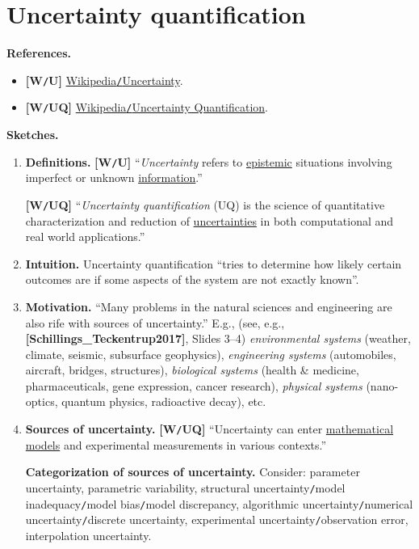 \documentclass[oneside,11pt]{book}
\numberwithin{equation}{section}
\begin{document}
\section{Uncertainty quantification}
\textbf{References.}
\begin{itemize}
    \item \textbf{[W\texttt{/}U]} \href{https://en.wikipedia.org/wiki/Uncertainty}{Wikipedia\texttt{/}Uncertainty}.
    \item \textbf{[W\texttt{/}UQ]} \href{https://en.wikipedia.org/wiki/Uncertainty_quantification}{Wikipedia\texttt{/}Uncertainty Quantification}.
\end{itemize}
\textbf{Sketches.}
\begin{enumerate}
    \item \textbf{Definitions.} \textbf{[W\texttt{/}U]} ``\textit{Uncertainty} refers to \href{https://en.wikipedia.org/wiki/Epistemology}{epistemic} situations involving imperfect or unknown \href{https://en.wikipedia.org/wiki/Information}{information}.''
    
    \textbf{[W\texttt{/}UQ]} ``\textit{Uncertainty quantification} (UQ) is the science of quantitative characterization and reduction of \href{https://en.wikipedia.org/wiki/Uncertainty}{uncertainties} in both computational and real world applications.''
    \item \textbf{Intuition.} Uncertainty quantification ``tries to determine how likely certain outcomes are if some aspects of the system are not exactly known''.
    \item \textbf{Motivation.} ``Many problems in the natural sciences and engineering are also rife with sources of uncertainty.'' E.g., (see, e.g., \textbf{[Schillings\_Teckentrup2017]}, Slides 3--4) \textit{environmental systems} (weather, climate, seismic, subsurface geophysics), \textit{engineering systems} (automobiles, aircraft, bridges, structures), \textit{biological systems} (health \& medicine, pharmaceuticals, gene expression, cancer research), \textit{physical systems} (nano-optics, quantum physics, radioactive decay), etc.
    \item \textbf{Sources of uncertainty.} \textbf{[W\texttt{/}UQ]} ``Uncertainty can enter \href{https://en.wikipedia.org/wiki/Mathematical_model}{mathematical models} and experimental measurements in various contexts.''
    
    \textbf{Categorization of sources of uncertainty.} Consider: parameter uncertainty, parametric variability, structural uncertainty\texttt{/}model inadequacy\texttt{/}model bias\texttt{/}model discrepancy, algorithmic uncertainty\texttt{/}numerical uncertainty\texttt{/}discrete uncertainty, experimental uncertainty\texttt{/}observation error, interpolation uncertainty.
    

\end{enumerate}
\end{document}
